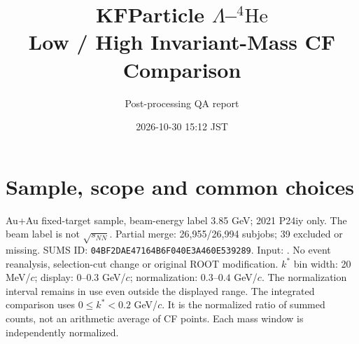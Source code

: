 \documentclass[10pt,a4paper]{article}
\title{KFParticle $\Lambda$--$^{4}\mathrm{He}$\\Low / High Invariant-Mass CF Comparison}
\author{Post-processing QA report}
\date{2026-10-30 15:12 JST}
\begin{document}
\maketitle
\section{Sample, scope and common choices}
Au+Au fixed-target sample, beam-energy label 3.85 GeV; 2021 P24iy only. The beam label is not $\sqrt{s_{NN}}$. Partial merge: 26,955/26,994 subjobs; 39 excluded or missing.
SUMS ID: \texttt{04BF2DAE47164B6F040E3A460E539289}.
Input: {\small{}}. No event reanalysis, selection-cut change or original ROOT modification.
$k^*$ bin width: 20 MeV/$c$; display: $0$--$0.3$ GeV/$c$; normalization: $0.3$--$0.4$ GeV/$c$. The normalization interval remains in use even outside the displayed range.
The integrated comparison uses $0\leq k^*<0.2$ GeV/$c$. It is the normalized ratio of summed counts, not an arithmetic average of CF points. Each mass window is independently normalized.
\end{document}
